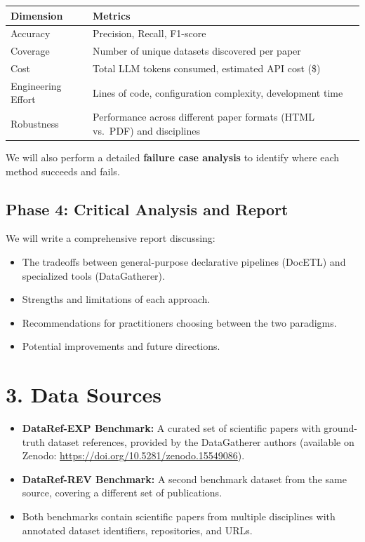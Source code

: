 \documentclass[11pt]{article}
\begin{document}
\noindent
\begin{tabularx}{\textwidth}{lX}
\toprule
\textbf{Dimension} & \textbf{Metrics} \\
\midrule
Accuracy & Precision, Recall, F1-score \\
Coverage & Number of unique datasets discovered per paper \\
Cost & Total LLM tokens consumed, estimated API cost (\$) \\
Engineering Effort & Lines of code, configuration complexity, development time \\
Robustness & Performance across different paper formats (HTML vs.\ PDF) and disciplines \\
\bottomrule
\end{tabularx}

We will also perform a detailed \textbf{failure case analysis} to identify where each method succeeds and fails.

\subsection{Phase 4: Critical Analysis and Report}

We will write a comprehensive report discussing:

\begin{itemize}[nosep]
    \item The tradeoffs between general-purpose declarative pipelines (DocETL) and specialized tools (DataGatherer).
    \item Strengths and limitations of each approach.
    \item Recommendations for practitioners choosing between the two paradigms.
    \item Potential improvements and future directions.
\end{itemize}

\section{3. Data Sources}

\begin{itemize}[nosep]
    \item \textbf{DataRef-EXP Benchmark:} A curated set of scientific papers with ground-truth dataset references, provided by the DataGatherer authors (available on Zenodo: \url{https://doi.org/10.5281/zenodo.15549086}).
    \item \textbf{DataRef-REV Benchmark:} A second benchmark dataset from the same source, covering a different set of publications.
    \item Both benchmarks contain scientific papers from multiple disciplines with annotated dataset identifiers, repositories, and URLs.
\end{itemize}
\end{document}
